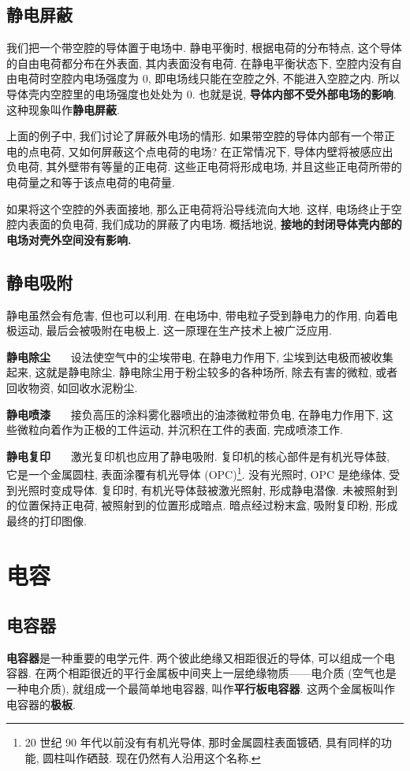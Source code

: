 \documentclass[UTF8,openany,fontset=fandol]{ctexbook}
\theoremstyle{chinesetextbook}
\newcommand{\bre}{\ \ \ }
\begin{document}
\subsection{静电屏蔽}
我们把一个带空腔的导体置于电场中. 静电平衡时, 根据电荷的分布特点, 这个导体的自由电荷都分布在外表面, 其内表面没有电荷. 在静电平衡状态下, 空腔内没有自由电荷时空腔内电场强度为 0, 即电场线只能在空腔之外, 不能进入空腔之内. 所以导体壳内空腔里的电场强度也处处为 0. 也就是说, \textbf{导体内部不受外部电场的影响}. 这种现象叫作\textbf{静电屏蔽}.

上面的例子中, 我们讨论了屏蔽外电场的情形. 如果带空腔的导体内部有一个带正电的点电荷, 又如何屏蔽这个点电荷的电场? 在正常情况下, 导体内壁将被感应出负电荷, 其外壁带有等量的正电荷. 这些正电荷将形成电场, 并且这些正电荷所带的电荷量之和等于该点电荷的电荷量.

如果将这个空腔的外表面接地, 那么正电荷将沿导线流向大地. 这样, 电场终止于空腔内表面的负电荷, 我们成功的屏蔽了内电场. 概括地说, \textbf{接地的封闭导体壳内部的电场对壳外空间没有影响.}
\subsection{静电吸附}
静电虽然会有危害, 但也可以利用. 在电场中, 带电粒子受到静电力的作用, 向着电极运动, 最后会被吸附在电极上. 这一原理在生产技术上被广泛应用.

\textbf{静电除尘} \bre 设法使空气中的尘埃带电, 在静电力作用下, 尘埃到达电极而被收集起来, 这就是静电除尘. 静电除尘用于粉尘较多的各种场所, 除去有害的微粒, 或者回收物资, 如回收水泥粉尘.

\textbf{静电喷漆} \bre 接负高压的涂料雾化器喷出的油漆微粒带负电, 在静电力作用下, 这些微粒向着作为正极的工件运动, 并沉积在工件的表面, 完成喷漆工作.

\textbf{静电复印} \bre 激光复印机也应用了静电吸附. 复印机的核心部件是有机光导体鼓, 它是一个金属圆柱, 表面涂覆有机光导体 (OPC)\footnote{20 世纪 90 年代以前没有有机光导体, 那时金属圆柱表面镀硒, 具有同样的功能, 圆柱叫作硒鼓. 现在仍然有人沿用这个名称.}. 没有光照时, OPC 是绝缘体, 受到光照时变成导体. 复印时, 有机光导体鼓被激光照射, 形成静电潜像. 未被照射到的位置保持正电荷, 被照射到的位置形成暗点. 暗点经过粉末盒, 吸附复印粉, 形成最终的打印图像.
\section{电容}
\subsection{电容器}
\textbf{电容器}是一种重要的电学元件. 两个彼此绝缘又相距很近的导体, 可以组成一个电容器. 在两个相距很近的平行金属板中间夹上一层绝缘物质——电介质 (空气也是一种电介质), 就组成一个最简单地电容器, 叫作\textbf{平行板电容器}. 这两个金属板叫作电容器的\textbf{极板}.
\end{document}
